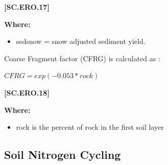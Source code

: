             {\raggedleft \textbf{[SC.ERO.17]}\par}
            \vspace{0.5cm}

        \textbf{Where:}
            
        \begin{itemize}
            \item sedsnow = snow adjusted sediment yield.
        \end{itemize}
    \vspace{0.2cm}

Coarse Fragment factor (CFRG) is calculated as : 
            \vspace{0.5cm}
            
    \begin{center}
 \(CFRG = exp (-0.053 *  rock)	\)
    \end{center}
        \vspace{0.5cm} 
    
            {\raggedleft \textbf{[SC.ERO.18]}\par}
            \vspace{0.5cm}

        \textbf{Where:}
            
        \begin{itemize}
            \item rock is the percent of rock in the first soil layer
        \end{itemize}
    \vspace{0.5cm}

\subsection{Soil Nitrogen Cycling}
\vspace{0.2cm}



